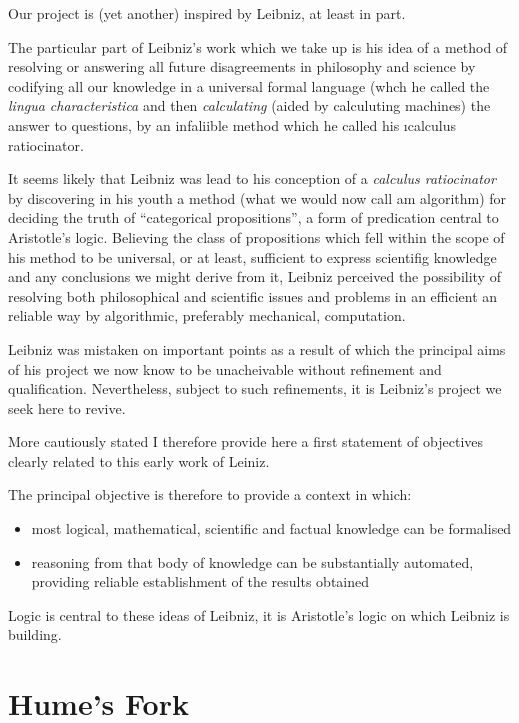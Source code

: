 Our project is (yet another) inspired by Leibniz, at least in part.

The particular part of Leibniz's work which we take up is his idea of a method of resolving or answering all future disagreements in philosophy and science by codifying all our knowledge in a universal formal language (whch he called the {\it lingua characteristica} and then {\it calculating} (aided by calculuting machines) the answer to questions, by an infaliible method which he called his {\i calculus ratiocinator}.

It seems likely that Leibniz was lead to his conception of a {\it calculus ratiocinator} by discovering in his youth a method (what we would now call am algorithm) for deciding the truth of ``categorical propositions'', a form of predication central to Aristotle's logic.
Believing the class of propositions which fell within the scope of his method to be universal, or at least, sufficient to express scientifig knowledge and any conclusions we might derive from it, Leibniz perceived the possibility of resolving both philosophical and scientific issues and problems in an efficient an reliable way by algorithmic, preferably mechanical, computation.

Leibniz was mistaken on important points as a result of which the principal aims of his project we now know to be unacheivable without refinement and qualification.
Nevertheless, subject to such refinements, it is Leibniz's project we seek here to revive.

More cautiously stated I therefore provide here a first statement of objectives clearly related to this early work of Leiniz.

The principal objective is therefore to provide a context in which:

\begin{itemize}
\item most logical, mathematical, scientific and factual knowledge can be formalised
\item reasoning from that body of knowledge can be substantially automated, providing reliable establishment of the results obtained
\end{itemize}

Logic is central to these ideas of Leibniz, it is Aristotle's logic on which Leibniz is building.
 


\section{Hume's Fork}

